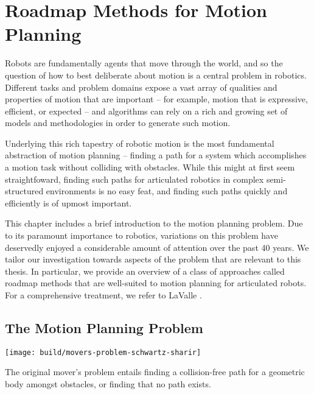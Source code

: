 \chapter{Roadmap Methods for Motion Planning}
\label{chap:roadmaps}

Robots are fundamentally agents that move through the world,
and so the question of how to best deliberate about motion
is a central problem in robotics.
Different tasks and problem domains expose a vast array of
qualities and properties of motion that are important
-- for example, motion that is expressive, efficient, or expected
-- and algorithms can rely on a rich and growing set
of models and methodologies in order to generate such motion.

Underlying this rich tapestry of robotic motion
is the most fundamental abstraction of motion planning --
finding a path for a system which accomplishes a motion task
without colliding with obstacles.
While this might at first seem straightfoward,
finding such paths for articulated robotics in
complex semi-structured environments
is no easy feat,
and finding such paths quickly and efficiently
is of upmost important.

This chapter includes a brief introduction to
the motion planning problem.
Due to its paramount importance to robotics,
variations on this problem have deservedly
enjoyed a considerable amount of attention over the past 40 years.
We tailor our investigation towards aspects of the problem
that are relevant to this thesis.
In particular,
we provide an overview of a class of approaches called roadmap methods
that are well-suited to motion planning for articulated robots.
For a comprehensive treatment,
we refer to LaValle \citep{lavalle2006planningbook}.

\section{The Motion Planning Problem}

\begin{marginfigure}
   \centering
   \texttt{[image: build/movers-problem-schwartz-sharir]} %
   \caption{The original mover's problem
      \citep{schwartzsharir1983pianomovers1}
      entails finding a collision-free path for a geometric body
      amongst obstacles,
      or finding that no path exists.}
   \label{fig:roadmaps:movers}
\end{marginfigure}

